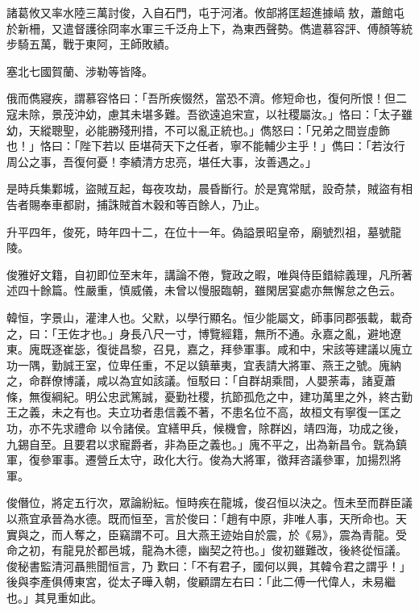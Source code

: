 \begin{pinyinscope}
 諸葛攸又率水陸三萬討俊，入自石門，屯于河渚。攸部將匡超進據嵪敖，蕭館屯於新柵，又遣督護徐冏率水軍三千泛舟上下，為東西聲勢。儁遣慕容評、傅顏等統步騎五萬，戰于東阿，王師敗績。



 塞北七國賀蘭、涉勒等皆降。



 俄而儁寢疾，謂慕容恪曰：「吾所疾惙然，當恐不濟。修短命也，復何所恨！但二寇未除，景茂沖幼，慮其未堪多難。吾欲遠追宋宣，以社稷屬汝。」恪曰：「太子雖幼，天縱聰聖，必能勝殘刑措，不可以亂正統也。」儁怒曰：「兄弟之間豈虛飾也！」恪曰：「陛下若以
 臣堪荷天下之任者，寧不能輔少主乎！」儁曰：「若汝行周公之事，吾復何憂！李績清方忠亮，堪任大事，汝善遇之。」



 是時兵集鄴城，盜賊互起，每夜攻劫，晨昏斷行。於是寬常賦，設奇禁，賊盜有相告者賜奉車都尉，捕誅賊首木穀和等百餘人，乃止。



 升平四年，俊死，時年四十二，在位十一年。偽謚景昭皇帝，廟號烈祖，墓號龍陵。



 俊雅好文籍，自初即位至末年，講論不倦，覽政之暇，唯與侍臣錯綜義理，凡所著述四十餘篇。性嚴重，慎威儀，未曾以慢服臨朝，雖閑居宴處亦無懈怠之色云。



 韓恒，字景山，灌津人也。父默，以學行顯名。恒少能屬文，師事同郡張載，載奇之，曰：「王佐才也。」身長八尺一寸，博覽經籍，無所不通。永嘉之亂，避地遼東。廆既逐崔毖，復徙昌黎，召見，嘉之，拜參軍事。咸和中，宋該等建議以廆立功一隅，勤誠王室，位卑任重，不足以鎮華夷，宜表請大將軍、燕王之號。廆納之，命群僚博議，咸以為宜如該議。恒駁曰：「自群胡乘間，人嬰荼毒，諸夏蕭條，無復綱紀。明公忠武篤誠，憂勤社稷，抗節孤危之中，建功萬里之外，終古勤王之義，未之有也。夫立功者患信義不著，不患名位不高，故桓文有寧復一匡之功，亦不先求禮命
 以令諸侯。宜繕甲兵，候機會，除群凶，靖四海，功成之後，九錫自至。且要君以求寵爵者，非為臣之義也。」廆不平之，出為新昌令。皝為鎮軍，復參軍事。遷營丘太守，政化大行。俊為大將軍，徵拜咨議參軍，加揚烈將軍。



 俊僭位，將定五行次，眾論紛紜。恒時疾在龍城，俊召恒以決之。恆未至而群臣議以燕宜承晉為水德。既而恒至，言於俊曰：「趙有中原，非唯人事，天所命也。天實與之，而人奪之，臣竊謂不可。且大燕王迹始自於震，於《易》，震為青龍。受命之初，有龍見於都邑城，龍為木德，幽契之符也。」俊初雖難改，後終從恒議。俊秘書監清河聶熊聞恒言，乃
 歎曰：「不有君子，國何以興，其韓令君之謂乎！」後與李產俱傅東宮，從太子曄入朝，俊顧謂左右曰：「此二傅一代偉人，未易繼也。」其見重如此。




\end{pinyinscope}
